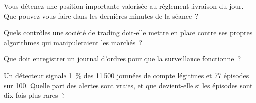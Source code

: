 \begin{interviewq}\label{iq:s2:manipulative-strategies-and-how-they-are-caught:3}
Vous détenez une position importante valorisée au règlement-livraison du jour. Que pouvez-vous faire dans les dernières minutes de la séance~?
\end{interviewq}

\begin{interviewq}\label{iq:s2:manipulative-strategies-and-how-they-are-caught:4}
Quels contrôles une société de trading doit-elle mettre en place contre ses propres algorithmes qui manipuleraient les marchés~?
\end{interviewq}

\begin{interviewq}\label{iq:s2:manipulative-strategies-and-how-they-are-caught:5}
Que doit enregistrer un journal d'ordres pour que la surveillance fonctionne~?
\end{interviewq}

\begin{interviewq}\label{iq:s2:manipulative-strategies-and-how-they-are-caught:6}
Un détecteur signale 1~\% des 11\,500 journées de compte légitimes et 77 épisodes sur 100. Quelle part des alertes sont vraies, et que devient-elle si les
épisodes sont dix fois plus rares~?
\end{interviewq}
